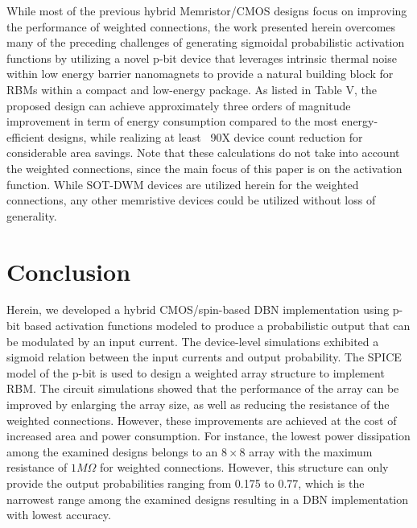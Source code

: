 While most of the previous hybrid Memristor/CMOS designs focus on improving the performance of weighted connections, the work presented herein overcomes many of the preceding challenges of generating sigmoidal probabilistic activation functions by utilizing a novel p-bit device that leverages intrinsic thermal noise within low energy barrier nanomagnets to provide a natural building block for RBMs within a compact and low-energy package. As listed in Table V, the proposed design can achieve approximately three orders of magnitude improvement in term of energy consumption compared to the most energy-efficient designs, while realizing at least ~90X device count reduction for considerable area savings. Note that these calculations do not take into account the weighted connections, since the main focus of this paper is on the activation function. While SOT-DWM devices are utilized herein for the weighted connections, any other memristive devices could be utilized without loss of generality.  

\section{Conclusion}
Herein, we developed a hybrid CMOS/spin-based DBN implementation using p-bit based activation functions modeled to produce a probabilistic output that can be modulated by an input current. The device-level simulations exhibited a sigmoid relation between the input currents and output probability. The SPICE model of the p-bit is used to design a weighted array structure to implement RBM. The circuit simulations showed that the performance of the array can be improved by enlarging the array size, as well as reducing the resistance of the weighted connections. However, these improvements are achieved at the cost of increased area and power consumption. For instance, the lowest power dissipation among the examined designs belongs to an $8 \times 8$ array with the maximum resistance of $1 M \Omega$ for weighted connections. However, this structure can only provide the output probabilities ranging from 0.175 to 0.77, which is the narrowest range among the examined designs resulting in a DBN implementation with lowest accuracy. 

